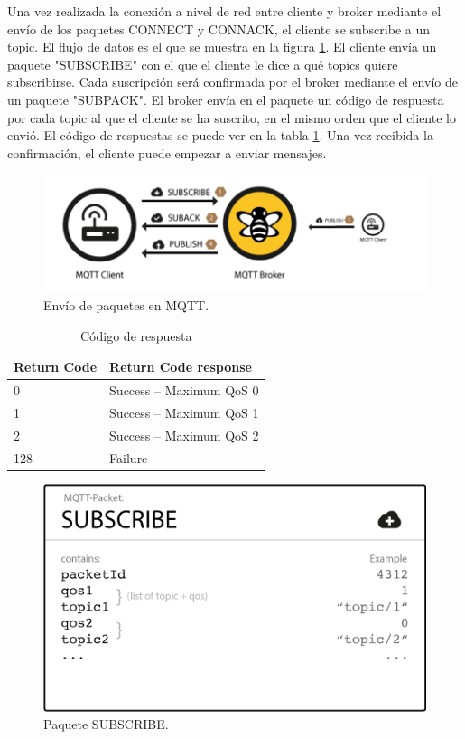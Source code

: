 \documentclass[12pt, twoside]{book}
\begin{document}
Una vez realizada la conexión a nivel de red entre cliente y broker mediante el envío de los paquetes CONNECT y CONNACK, el cliente se subscribe a un topic. El flujo de datos es el que se muestra en la figura \ref{L403}. El cliente envía un paquete "SUBSCRIBE" con el que el cliente le dice a qué topics quiere subscribirse. Cada suscripción será confirmada por el broker mediante el envío de un paquete "SUBPACK". El broker envía en el paquete un código de respuesta por cada topic al que el cliente se ha suscrito, en el mismo orden que el cliente lo envió. El código de respuestas se puede ver en la tabla \ref{table:return_code}. Una vez recibida la confirmación, el cliente puede empezar a enviar mensajes.
\begin{figure}[H]
\centering
\includegraphics[scale=0.5]{images/flujo_tipico.png}
\caption{Envío de paquetes en MQTT.\cite{hive}}\label{L403}
\end{figure}
\begin{table}[htbp]
\begin{center}
\begin{tabular}{|l|l|}
\hline
Return Code & Return Code response \\
\hline \hline
0 & Success – Maximum QoS 0 \\ \hline
1 & Success – Maximum QoS 1 \\ \hline
2 & Success – Maximum QoS 2 \\ \hline
128 & Failure
\end{tabular}
\caption{Código de respuesta}
\label{table:return_code}
\end{center}
\end{table}
\begin{figure}[H]
\centering
\includegraphics[scale=0.3]{images/subscribe_packet.png}
\caption{Paquete SUBSCRIBE.\cite{hive}}\label{L404}
\end{figure}
\end{document}
